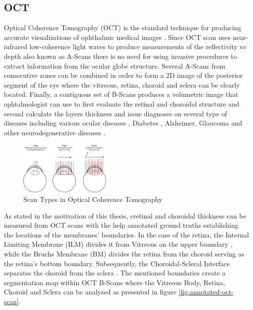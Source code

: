 \documentclass[12pt,a4paper]{scrartcl}
\begin{document}
\subsection{OCT}
Optical Coherence Tomography (OCT) is the standard technique for producing accurate visualizations of ophthalmic medical images \cite{Garrido2014}. Since OCT scan uses near-infrared low-coherence light waves to produce measurements of the reflectivity vs depth also known as A-Scans\cite{Garrido2014} there is no need for using invasive procedures to extract information from the ocular globe structure. Several A-Scans from consecutive zones can be combined in order to form a 2D image of the posterior segment of the eye where the vitreous, retina, choroid and sclera can be clearly located. Finally, a contiguous set of B-Scans produces a volumetric image that ophtalmologist can use to first evaluate the retinal and choroidal structure and second calculate the layers thickness and issue diagnoses on several type of diseases including various ocular diseases \cite{ronchetti2019}, Diabetes \cite{Jiang2018}, Alzheimer, Glaucoma and other neurodegenerative diseases \cite{DENHAAN2017162}.   

\begin{figure}[H]
    \centering
    \includegraphics[width=0.4\textwidth]{./images/csm_ABC_scans.png}
    \caption{Scan Types in Optical Coherence Tomography \cite{Willdeman2016}}
    \label{fig:mb-oct-abcscans}
\end{figure}

As stated in the motivation of this thesis, cretinal and choroidal thickness can be measured from OCT scans with the help annotated ground truths establishing the locations of the membranes' boundaries. In the case of the retina, the Internal Limiting Membrane (ILM) divides it from Vitreous on the upper boundary \cite{MACNAIR2015343}, while the Bruchs Membrane (BM) divides the retina from the choroid \cite{BOOIJ20101} serving as the retina's bottom boundary. Subsequently, the Choroidal-Scleral Interface separates the choroid from the sclera \cite{Ronchetti2018}. The mentioned boundaries create a segmentation map within OCT B-Scans where the Vitreous Body, Retina, Choroid and Sclera can be analysed as presented in figure \ref{fig:annotated-oct-scan}. 
\end{document}
